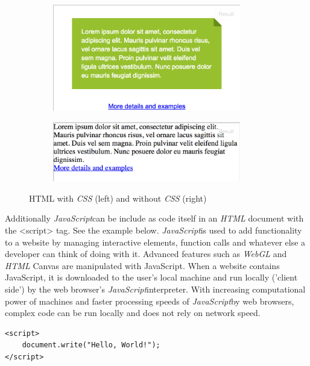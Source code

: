 \documentclass[a4paper,11pt,twoside]{article}
\begin{document}
\begin{figure}
\centering
\begin{subfigure}{.5\textwidth}
  \centering
  \includegraphics[width=82mm]{graphics/css_01.png}

  \label{fig:sub1}
\end{subfigure}%
\begin{subfigure}{.5\textwidth}
  \centering
  \includegraphics[width=82mm]{graphics/css_02.png}

  \label{fig:sub2}
\end{subfigure}
\caption{HTML with \textit{CSS} (left) and without \textit{CSS} (right)}

\end{figure}


Additionally \textit{JavaScript}can be include as code itself in an \textit{HTML} document with the <script> tag. See the example below. \textit{JavaScript}is used to add functionality to a website by managing interactive elements, function calls and whatever else a developer can think of doing with it. Advanced features such as \textit{WebGL} and \textit{HTML} Canvas are manipulated with JavaScript. When a website contains JavaScript, it is downloaded to the user's local machine and run locally ('client side') by the web browser's \textit{JavaScript}interpreter. With increasing computational power of machines and faster processing speeds of \textit{JavaScript}by web browsers, complex code can be run locally and does not rely on network speed.



\begin{verbatim}
<script>
    document.write("Hello, World!");
</script>
\end{verbatim}
\end{document}
